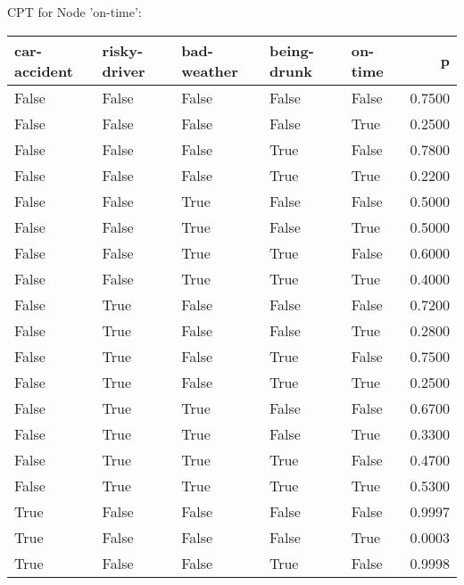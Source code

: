 
CPT for Node 'on-time':

\begin{tabular}{lllllr}
\toprule
 car-accident &  risky-driver &  bad-weather &  being-drunk &  on-time &      p \\
\midrule
        False &         False &        False &        False &    False & 0.7500 \\
        False &         False &        False &        False &     True & 0.2500 \\
        False &         False &        False &         True &    False & 0.7800 \\
        False &         False &        False &         True &     True & 0.2200 \\
        False &         False &         True &        False &    False & 0.5000 \\
        False &         False &         True &        False &     True & 0.5000 \\
        False &         False &         True &         True &    False & 0.6000 \\
        False &         False &         True &         True &     True & 0.4000 \\
        False &          True &        False &        False &    False & 0.7200 \\
        False &          True &        False &        False &     True & 0.2800 \\
        False &          True &        False &         True &    False & 0.7500 \\
        False &          True &        False &         True &     True & 0.2500 \\
        False &          True &         True &        False &    False & 0.6700 \\
        False &          True &         True &        False &     True & 0.3300 \\
        False &          True &         True &         True &    False & 0.4700 \\
        False &          True &         True &         True &     True & 0.5300 \\
         True &         False &        False &        False &    False & 0.9997 \\
         True &         False &        False &        False &     True & 0.0003 \\
         True &         False &        False &         True &    False & 0.9998 \\

\end{tabular}
